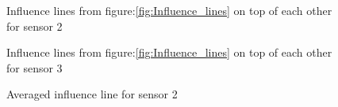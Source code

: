 %     
%     
%     

\begin{figure}[H]
	\begin{adjustbox}{center}
		
	\end{adjustbox}
	\caption{Influence lines from figure:\ref{fig:Influence_lines} on top of each other for sensor 2}
	\label{fig:infl_all_trains_sensor2}
\end{figure}

\begin{figure}[H]
  \begin{adjustbox}{center}
    
  \end{adjustbox}
  \caption{Influence lines from figure:\ref{fig:Influence_lines} on top of each other for sensor 3}
  \label{fig:infl_all_trains_sensor3}
\end{figure}

\begin{figure}[H]
	\begin{adjustbox}{center}
		
	\end{adjustbox}
	\caption{Averaged influence line for sensor 2}
	\label{fig:infl_avg_sensor2_standard}
\end{figure}

